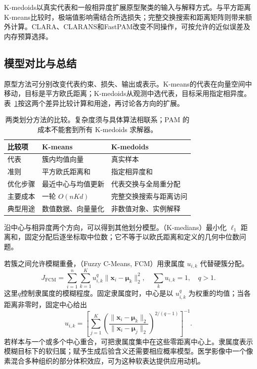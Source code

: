 K-medoids以真实代表和一般相异度扩展原型聚类的输入与解释方式。与平方距离K-means比较时，极端值影响需结合所选损失；完整交换搜索和距离矩阵则带来额外计算。CLARA、CLARANS和FastPAM改变不同操作，可按允许的近似误差及内存预算选择。

\subsection{模型对比与总结}

原型方法可分别改变代表约束、损失、输出或表示。K-means的代表在向量空间中移动，目标是平方欧氏距离；K-medoids从观测中选代表，目标采用指定相异度。表~\ref{tab:clustering-partition}按这两个差异比较计算和用途，再讨论各方向的扩展。

\begin{table}[htbp]
 \small
 \begin{tabularx}{\linewidth}{@{}l>{\RaggedRight\arraybackslash}X>{\RaggedRight\arraybackslash}X@{}}
 \toprule
 比较项 & K-means & K-medoids\\
 \midrule
 代表 & 簇内均值向量 & 真实样本\\
 准则 & 平方欧氏距离和 & 指定相异度和\\
 优化步骤 & 最近中心与均值更新 & 代表交换与全局重分配\\
 主要成本 & 一轮 $O(nKd)$ & 完整交换搜索与距离访问\\
 典型用途 & 数值数据、向量量化 & 非数值对象、实例解释\\
 \bottomrule
 \end{tabularx}
 \caption{两类划分方法的比较。复杂度须与具体算法相联系；PAM 的成本不能套到所有 K-medoids 求解器。}
 \label{tab:clustering-partition}
\end{table}

沿中心与相异度两个方向，可以得到其他划分模型。（K-medians）最小化 $\ell_1$ 距离和，固定分配后逐坐标取中位数；它不等于以欧氏距离和定义的几何中位数问题。

\Needspace{45mm}
若簇之间允许模糊重叠，（Fuzzy C-Means, FCM）用隶属度 $u_{i,k}$ 代替硬簇分配。
\begin{equation}
 J_{\mathrm{FCM}}
 =\sum_{i=1}^n\sum_{k=1}^K
 u_{i,k}^{q}\lVert\bm{x}_i-\bm{\mu}_k\rVert_2^2,
 \quad \sum_k u_{i,k}=1,\quad q>1.
 \label{eq:clustering-fcm}
\end{equation}
这里$q$控制隶属度的模糊程度。固定隶属度时，中心是以 $u_{i,k}^q$ 为权重的均值；当各距离非零时，固定中心给出
\[
 u_{i,k}=
 \left[
 \sum_{j=1}^K
 \left(\frac{\lVert\bm{x}_i-\bm{\mu}_k\rVert_2}
 {\lVert\bm{x}_i-\bm{\mu}_j\rVert_2}\right)^{2/(q-1)}
 \right]^{-1}.
\]
若样本与一个或多个中心重合，可把隶属度集中在这些零距离中心上。隶属度表示模糊目标下的软归属；赋予生成后验含义还需要相应概率模型。医学影像中一个像素混合多种组织的部分体积效应，可为这种软表达提供应用动机。

